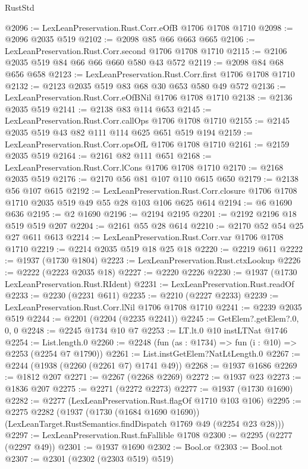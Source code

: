 \begin{lexlean}{RustStd}
\begin{coremodule}
@2096 := LexLeanPreservation.Rust.Corr.eOfB @1706 @1708 @1710
@2098 := @2096 @2035 @519
@2102 := @2098 @85 @66 @663 @665
@2106 := LexLeanPreservation.Rust.Corr.second @1706 @1708 @1710
@2115 := @2106 @2035 @519 @84 @66 @66 @660 @580 @43 @572
@2119 := @2098 @84 @68 @656 @658
@2123 := LexLeanPreservation.Rust.Corr.first @1706 @1708 @1710
@2132 := @2123 @2035 @519 @83 @68 @30 @653 @580 @49 @572
@2136 := LexLeanPreservation.Rust.Corr.eOfBNil @1706 @1708 @1710
@2138 := @2136 @2035 @519
@2141 := @2138 @83 @114 @653
@2145 := LexLeanPreservation.Rust.Corr.callOps @1706 @1708 @1710
@2155 := @2145 @2035 @519 @43 @82 @111 @114 @625 @651 @519 @194
@2159 := LexLeanPreservation.Rust.Corr.opsOfL @1706 @1708 @1710
@2161 := @2159 @2035 @519
@2164 := @2161 @82 @111 @651
@2168 := LexLeanPreservation.Rust.Corr.lCons @1706 @1708 @1710
@2170 := @2168 @2035 @519
@2176 := @2170 @56 @81 @107 @110 @615 @650
@2179 := @2138 @56 @107 @615
@2192 := LexLeanPreservation.Rust.Corr.closure
    @1706
    @1708
    @1710
    @2035
    @519
    @49
    @55
    @28
    @103
    @106
    @625
    @614
@2194 := @6 @1690 @636
@2195 := @2 @1690
@2196 := @2194 @2195
@2201 := @2192 @2196 @18 @519 @519 @207
@2204 := @2161 @55 @28 @614
@2210 := @2170 @52 @54 @25 @27 @611 @613
@2214 := LexLeanPreservation.Rust.Corr.var @1706 @1708 @1710
@2219 := @2214 @2035 @519 @18 @25 @18
@2220 := @2219 @611
@2222 := @1937 (@1730 @1804)
@2223 := LexLeanPreservation.Rust.ctxLookup
@2226 := @2222 (@2223 @2035 @18)
@2227 := @2220 @2226
@2230 := @1937 (@1730 LexLeanPreservation.Rust.RIdent)
@2231 := LexLeanPreservation.Rust.readOf
@2233 := @2230 (@2231 @611)
@2235 := @2210 (@2227 @2233)
@2239 := LexLeanPreservation.Rust.Corr.lNil @1706 @1708 @1710
@2241 := @2239 @2035 @519
@2244 := @2201 (@2204 (@2235 @2241))
@2245 := GetElem?.getElem?.{0, 0, 0}
@2248 := @2245 @1734 @10 @7
@2253 := LT.lt.{0} @10 instLTNat @1746
@2254 := List.length.{0}
@2260 := @2248 (fun (as : @1734) => fun (i : @10) => @2253 (@2254 @7 @1790))
@2261 := List.instGetElem?NatLtLength.{0}
@2267 := @2244 (@1938 (@2260 (@2261 @7) @1741 @49))
@2268 := @1937 @1686
@2269 := @1812 @207
@2271 := @2267 (@2268 @2269)
@2272 := @1937 @23
@2273 := @1836 @207
@2275 := @2271 (@2272 @2273)
@2277 := @1937 (@1730 @1690)
@2282 := @2277 (LexLeanPreservation.Rust.flagOf @1710 @103 @106)
@2295 := @2275
    @2282
    (@1937
      (@1730 (@1684 @1690 @1690))
      (LexLeanTarget.RustSemantics.findDispatch @1769 @49 (@2254 @23 @28)))
@2297 := LexLeanPreservation.Rust.fnFallible @1708
@2300 := @2295 (@2277 (@2297 @49))
@2301 := @1937 @1690
@2302 := Bool.or
@2303 := Bool.not
@2307 := @2301 (@2302 (@2303 @519) @519)

\end{coremodule}
\end{lexlean}
